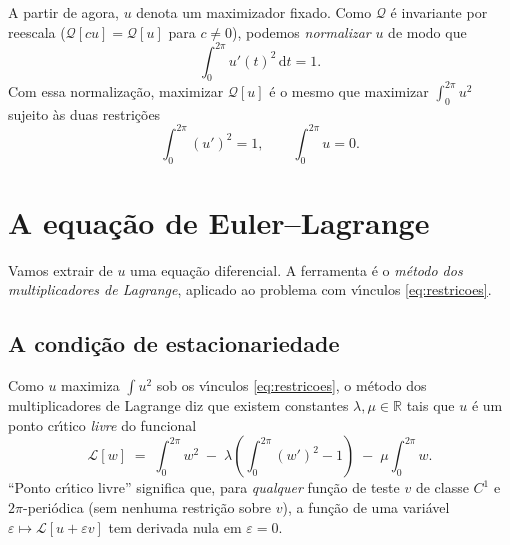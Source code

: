\documentclass[11pt,a4paper]{amsart}
\newcommand{\R}{\mathbb{R}}
\renewcommand{\d}{\mathrm{d}}
\newcommand{\Q}{\mathcal{Q}}
\theoremstyle{plain}
\theoremstyle{definition}
\theoremstyle{remark}
\begin{document}
A partir de agora, $u$ denota um maximizador fixado. Como $\Q$ \'e
invariante por reescala ($\Q[cu]=\Q[u]$ para $c\neq 0$), podemos
\emph{normalizar} $u$ de modo que
\begin{equation}\label{eq:normaliza}
  \int_0^{2\pi} u'(t)^2\,\d t = 1 .
\end{equation}
Com essa normaliza\c{c}\~ao, maximizar $\Q[u]$ \'e o mesmo que maximizar
$\int_0^{2\pi}u^2$ sujeito \`as duas restri\c{c}\~oes
\begin{equation}\label{eq:restricoes}
  \int_0^{2\pi}(u')^2 = 1 ,
  \qquad
  \int_0^{2\pi} u = 0 .
\end{equation}

\section{A equa\c{c}\~ao de Euler--Lagrange}
\label{sec:EL}

Vamos extrair de $u$ uma equa\c{c}\~ao diferencial. A ferramenta \'e o
\emph{m\'etodo dos multiplicadores de Lagrange}, aplicado ao problema com
v\'\i nculos \eqref{eq:restricoes}.

\subsection{A condi\c{c}\~ao de estacionariedade}

Como $u$ maximiza $\int u^2$ sob os v\'\i nculos \eqref{eq:restricoes}, o
m\'etodo dos multiplicadores de Lagrange diz que existem constantes
$\lambda,\mu\in\R$ tais que $u$ \'e um ponto cr\'\i tico \emph{livre} do
funcional
\begin{equation}\label{eq:lagrangiano}
  \mathcal{L}[w]
  \;=\; \int_0^{2\pi} w^2
        \;-\;\lambda\!\left(\int_0^{2\pi}(w')^2 - 1\right)
        \;-\;\mu\int_0^{2\pi} w .
\end{equation}
``Ponto cr\'\i tico livre'' significa que, para \emph{qualquer} fun\c{c}\~ao
de teste $v$ de classe $C^1$ e $2\pi$-peri\'odica (sem nenhuma
restri\c{c}\~ao sobre $v$), a fun\c{c}\~ao de uma vari\'avel
$\varepsilon\mapsto \mathcal{L}[u+\varepsilon v]$ tem derivada nula em
$\varepsilon=0$.
\end{document}
